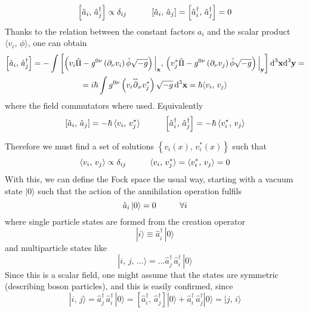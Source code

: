 \begin{equation}
	\left[\hat{a}_i,\,\hat{a}_j^\dagger\right]\propto \delta_{ij}\hspace{1.0cm}\left[\hat{a}_i,\,\hat{a}_j\right]=\left[\hat{a}_i^\dagger,\,\hat{a}_j^\dagger\right]=0
\end{equation}
Thanks to the relation between the constant factors $a_i$ and the scalar product $\langle v_i,\,\phi\rangle$, one can obtain
\begin{multline}
	\left[\hat{a}_i,\,\hat{a}_j^\dagger\right]=-\int\left[\left(v_i\hat{\Pi}-g^{0\nu}\left(\partial_\nu v_i\right)\hat{\phi}\sqrt{-g}\right)\Big|_\mathbf{x},\,\left(v_j^*\hat{\Pi}-g^{0\nu}\left(\partial_\nu v_j\right)\hat{\phi}\sqrt{-g}\right)\Big|_\mathbf{y}\right]\text{d}^3\mathbf{x}\text{d}^3\mathbf{y}=\\
	=i\hbar\int g^{0\nu}\left(v_i\overset{\text{\tiny$\leftrightarrow$}}{\partial}_\nu v_j^*\right)\sqrt{-g}\,\text{d}^3\mathbf{x}=\hbar\langle v_i,\,v_j\rangle
\end{multline}
where the field commutators where used. Equivalently 
\begin{equation}
	\left[\hat{a}_i,\,\hat{a}_j\right]=-\hbar\,\langle v_i,\,v_j^*\rangle\hspace{1.0cm}\left[\hat{a}_i^\dagger,\,\hat{a}_j^\dagger\right]=-\hbar\,\langle v_i^*,\,v_j\rangle
\end{equation}

Therefore we must find a set of solutions $\left\{v_i(x),\,v_i^*(x)\right\}$ such that
\begin{equation}
	\langle v_i,\,v_j\rangle\propto \delta_{ij}\hspace{1.0cm}\langle v_i,\,v_j^*\rangle=\langle v_i^*,\,v_j\rangle=0
\end{equation}
With this, we can define the Fock space the usual way, starting with a vacuum state $|0\rangle$ such that the action of the annihilation operation fulfils
\begin{equation}
	\hat{a}_i\,|0\rangle=0\hspace{1.0cm}\forall i
\end{equation}
where single particle states are formed from the creation operator
\begin{equation}
	|i\rangle\equiv \hat{a}^\dagger_i\,|0\rangle
\end{equation}
and multiparticle states like
\begin{equation}
	|i,\,j,\,\hdots\rangle=\hdots \hat{a}_j^\dagger\,\hat{a}_i^\dagger\,|0\rangle
\end{equation}
Since this is a scalar field, one might assume that the states are symmetric (describing boson particles), and this is easily confirmed, since
\begin{equation}
	|i,\,j\rangle=\hat{a}_j^\dagger\,\hat{a}_i^\dagger\,|0\rangle=\left[\hat{a}_i^\dagger,\,\hat{a}_j^\dagger\right]|0\rangle+\hat{a}_i^\dagger\,\hat{a}_j^\dagger|0\rangle=|j,\,i\rangle
\end{equation}
